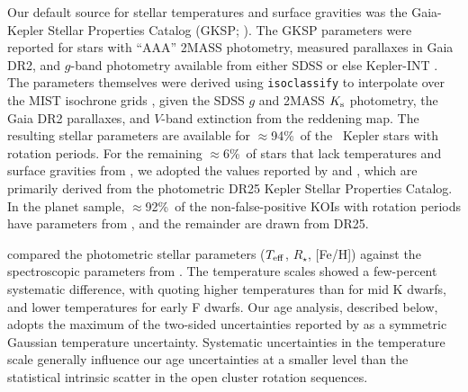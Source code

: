 \documentclass[11pt,twocolumn,tighten,linenumbers]{aastex63}
\newcommand{\fracstarswithprotwithbtwenty}{{$\approx$94\%}}
\newcommand{\fracstarswithprotwithoutbtwenty}{{$\approx$6\%}}
\newcommand{\frackoisnofpwithprotwithbtwenty}{{$\approx$92\%}}
\begin{document}
Our default source for stellar temperatures and surface gravities was
the Gaia-Kepler Stellar Properties Catalog (GKSP;
\citealt{Berger_2020a_catalog}).  The GKSP parameters were reported
for stars with ``AAA'' 2MASS photometry, measured parallaxes in Gaia
DR2,  and $g$-band photometry available from either SDSS or else
Kepler-INT \citep{2012AJ....144...24G}.  The parameters themselves
were derived using \texttt{isoclassify} \citep{2017ApJ...844..102H} to
interpolate over the MIST isochrone grids
\citep{Choi_2016,2016ApJS..222....8D}, given the SDSS $g$ and 2MASS
$K_{\rm s}$ photometry, the Gaia DR2 parallaxes, and $V$-band
extinction from the \citet{2019ApJ...887...93G} reddening map.  The
resulting stellar parameters are available for
\fracstarswithprotwithbtwenty\ of the \nuniqstarsantosrot\ Kepler
stars with rotation periods.  For the remaining
\fracstarswithprotwithoutbtwenty\ of stars that lack temperatures and
surface gravities from , we adopted
the values reported by \citet{Santos_2019} and \citet{Santos_2021},
which are primarily derived from the photometric \citet{Mathur_2017}
DR25 Kepler Stellar Properties Catalog.  In the planet sample,
\frackoisnofpwithprotwithbtwenty\ of the non-false-positive KOIs with
rotation periods have parameters from \citet{Berger_2020a_catalog},
and the remainder are drawn from DR25. 

\citet{David_2021} compared the photometric
 stellar parameters ($T_{\rm eff}$,
$R_\star$, [Fe/H]) against the spectroscopic parameters from
\citet{Fulton_2018}.  The temperature scales showed a few-percent
systematic difference, with  quoting higher
temperatures than  for mid K dwarfs,
and lower temperatures for early F dwarfs.  Our age analysis,
described below, adopts the maximum of the two-sided uncertainties
reported by  as a symmetric Gaussian
temperature uncertainty.  Systematic uncertainties in the temperature
scale generally influence our age uncertainties at a smaller level
than the statistical intrinsic scatter in the open cluster rotation
sequences.
\end{document}

